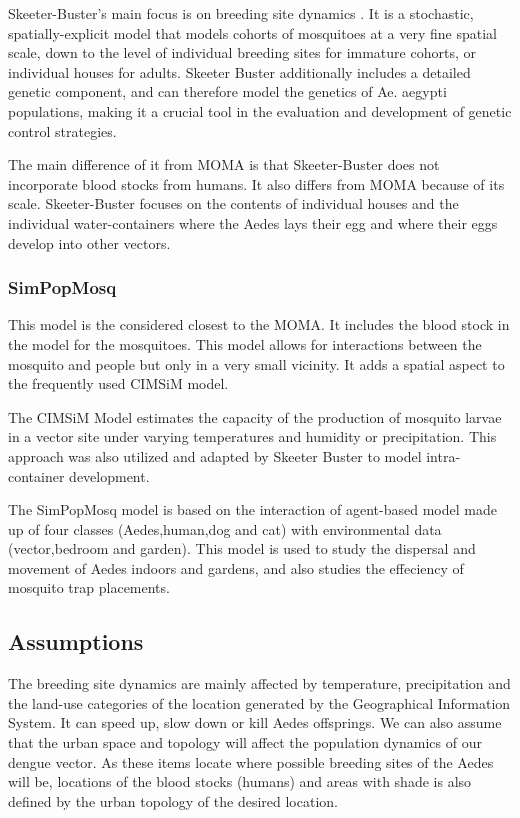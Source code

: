 Skeeter-Buster's main focus is on breeding site dynamics \cite{skeeter}. It is a stochastic, spatially-explicit model that models cohorts of mosquitoes at a very fine spatial scale, down to the level of individual breeding sites for immature cohorts, or individual houses for adults. Skeeter Buster additionally includes a detailed genetic component, and can therefore model the genetics of Ae. aegypti populations, making it a crucial tool in the evaluation and development of genetic control strategies. 

The main difference of it from MOMA is that Skeeter-Buster does not incorporate blood stocks from humans. It also differs from MOMA because of its scale. Skeeter-Buster focuses on the contents of individual houses and the individual water-containers where the Aedes lays their egg and where their eggs develop into other vectors. 

\subsubsection{SimPopMosq}

This model is the considered closest to the MOMA. It includes the blood stock in the model for the mosquitoes. This model allows for interactions between the mosquito and people but only in a very small vicinity\cite{sandro}. It adds a spatial aspect to the frequently used CIMSiM model. 

The CIMSiM Model estimates the capacity of the production of mosquito larvae in a vector site under varying temperatures and humidity or precipitation. This approach was also utilized and adapted by Skeeter Buster to model intra-container development\cite{somsakun,carlos}.

The SimPopMosq model is based on the interaction of agent-based model made up of four classes (Aedes,human,dog and cat) with environmental data (vector,bedroom and garden). This model is used to study the dispersal and movement of Aedes indoors and gardens, and also studies the effeciency of mosquito trap placements\cite{sandro}.


\subsection{Assumptions}
The breeding site dynamics are mainly affected by temperature, precipitation and the land-use categories of the location generated by the Geographical Information System. It can speed up, slow down or kill Aedes offsprings. We can also assume that the urban space and topology will affect the population dynamics of our dengue vector. As these items locate where possible breeding sites of the Aedes will be, locations of the blood stocks (humans) and areas with shade is also defined by the urban topology of the desired location.

